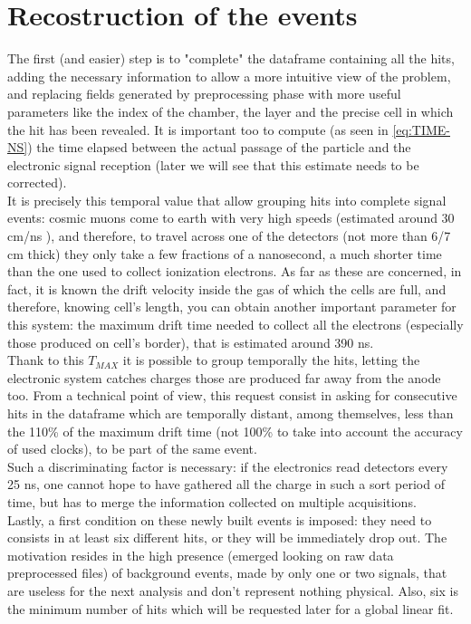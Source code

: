 \documentclass[a4paper,11pt]{book}
\begin{document}
\section{Recostruction of the events}

The first (and easier) step is to "complete" the dataframe containing all the hits, adding the necessary information to allow a more intuitive view of the problem, and replacing fields generated by preprocessing phase with more useful parameters like the index of the chamber, the layer and the precise cell in which the hit has been revealed. It is important too to compute (as seen in \ref{eq:TIME-NS}) the time elapsed between the actual passage of the particle and the electronic signal reception (later we will see that this estimate needs to be corrected).\\
 It is precisely this temporal value that allow grouping hits into complete signal events: cosmic muons come to earth with very high speeds (estimated around 30 cm/ns \cite{bib:cosmic_muons}), and therefore, to travel across one of the detectors (not more than 6/7 cm thick) they only take a few fractions of a nanosecond, a much shorter time than the one used to collect ionization electrons. As far as these are concerned, in fact, it is known the drift velocity inside the gas of which the cells are full, and therefore, knowing cell's length, you can obtain another important parameter for this system: the maximum drift time needed to collect all the electrons (especially those produced on cell's border), that is estimated around 390 ns.\\
Thank to this $T_{MAX}$ it is possible to group temporally the hits, letting the electronic system catches charges those are produced far away from the anode too. From a technical point of view, this request consist in asking for consecutive hits in the dataframe which are temporally distant, among themselves, less than the 110\% of the maximum drift time (not 100\% to take into account the accuracy of used clocks), to be part of the same event.\\
Such a discriminating factor is necessary: if the electronics read detectors every 25 ns, one cannot hope to have gathered all the charge in such a sort period of time, but has to merge the information collected on multiple acquisitions.\\
Lastly, a first condition on these newly built events is imposed: they need to consists in at least six different hits, or they will be immediately drop out. The motivation resides in the high presence (emerged looking on raw data preprocessed files) of background events, made by only one or two signals, that are useless for the next analysis and don't represent nothing physical. Also, six is the minimum number of hits which will be requested later for a global linear fit.\\
\end{document}
